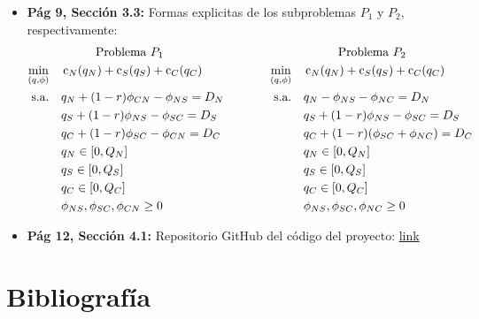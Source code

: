 \documentclass[12pt,twoside]{article}
\begin{document}
	\begin{itemize}
	\item \textbf{P\'ag 9, Secci\'on 3.3:} Formas explicitas de los subproblemas \(P_1\) y \(P_2\), respectivamente:
	\begin{equation*}\begin{aligned}
			& \text{\hspace{1cm}Problema \(P_1\)}& & \text{\hspace{1cm}Problema \(P_2\)}  \\
			\min_{(q,\phi)} \quad & \operatorname{c}_N(q_N)+\operatorname{c}_S(q_S)+\operatorname{c}_C(q_C) & \hspace{1cm} \min_{(q,\phi)} \quad & \operatorname{c}_N(q_N)+\operatorname{c}_S(q_S)+\operatorname{c}_C(q_C) \\
			\textrm{s.a.} \quad & q_N+(1-r)\phi_{CN}-\phi_{NS}=D_N & \textrm{s.a.} \quad & q_N-\phi_{NS}-\phi_{NC}=D_N \\
			& q_S+(1-r)\phi_{NS}-\phi_{SC}=D_S & & q_S+(1-r)\phi_{NS}-\phi_{SC}=D_S \\
			& q_C+(1-r)\phi_{SC}-\phi_{CN}=D_C & & q_C+(1-r)(\phi_{SC}+\phi_{NC})=D_C \\
			& q_N\in[0,Q_N] & & q_N\in[0,Q_N] \\
			& q_S\in[0,Q_S] & & q_S\in[0,Q_S] \\
			& q_C\in[0,Q_C] & & q_C\in[0,Q_C] \\
			& \phi_{NS},\phi_{SC},\phi_{CN}\geq0 & & \phi_{NS},\phi_{SC},\phi_{NC}\geq0 
	\end{aligned}\end{equation*}
		\item \textbf{P\'ag 12, Secci\'on 4.1:} Repositorio GitHub del c\'odigo del proyecto: \href{https://github.com/UFWM/USM_Lab_2023_S2/tree/main}{link}
	\end{itemize}
	
	\section{Bibliograf\'ia}
	
\end{document}

